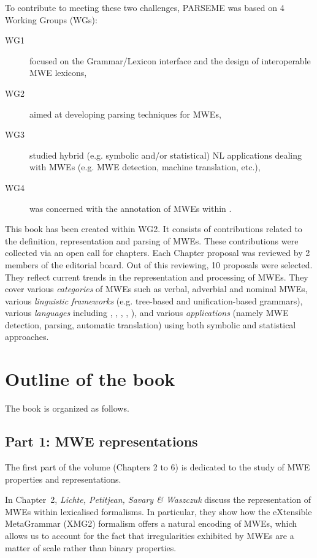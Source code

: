 \documentclass[output=paper]{langsci/langscibook}
\begin{document}
To contribute to meeting these two challenges, PARSEME was based on 4
Working Groups (WGs):
\begin{description}
\item[WG1] focused on the Grammar/Lexicon interface and the design of
  interoperable MWE lexicons,
\item[WG2] aimed at developing parsing techniques for MWEs,
\item[WG3] studied hybrid (e.g. symbolic and/or statistical) NL
  applications dealing with MWEs (e.g. MWE detection, machine
  translation, etc.),
\item[WG4] was concerned with the annotation of MWEs within .
\end{description}

This book has been created within WG2. It consists of contributions
related to the definition, representation and parsing of MWEs. These
contributions were collected via an open call for chapters. Each
Chapter proposal was reviewed by 2 members of the editorial board. Out
of this reviewing, 10 proposals were selected. They reflect current
trends in the representation and processing of MWEs. They cover
various \emph{categories} of MWEs such as verbal, adverbial and
nominal MWEs, various \emph{linguistic frameworks} (e.g. tree-based
and unification-based grammars), various \emph{languages} including
, , , , ), and various
\emph{applications} (namely MWE detection, parsing, automatic
translation) using both symbolic and statistical approaches.

\section{Outline of the book}

The book is organized as follows. 

\subsection*{Part 1: MWE representations}

The first part of the volume (Chapters 2 to 6) is dedicated to the
study of MWE properties and representations.

In Chapter~2, \textit{Lichte, Petitjean, Savary \& Waszczuk} discuss
the representation of MWEs within lexicalised formalisms. In
particular, they show how the eXtensible MetaGrammar (XMG2) formalism
offers a natural encoding of MWEs, which allows us to account for the
fact that irregularities exhibited by MWEs are a matter of scale
rather than binary properties.
\end{document}
